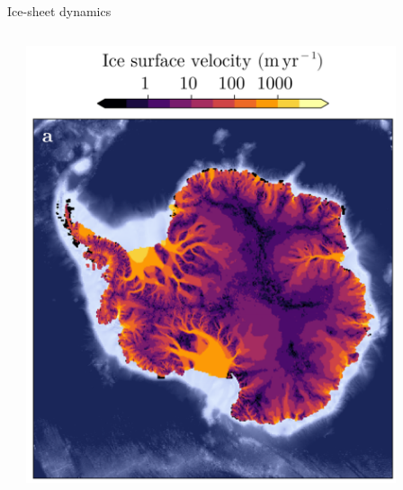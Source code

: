 \documentclass[aspectratio=169,xcolor=dvipsnames]{beamer}
\begin{document}
\begin{frame}[t]{Ice-sheet dynamics}
\begin{columns}
\begin{column}{0.5\textwidth}
    \end{column}
    \begin{column}{0.5\textwidth}
        \centering
        \includegraphics[width=0.85\textwidth]{figs/Fig-Antarctica-surface-velocity.png}
    \end{column}
\end{columns}
\centering
        
\end{frame}
\end{document}

